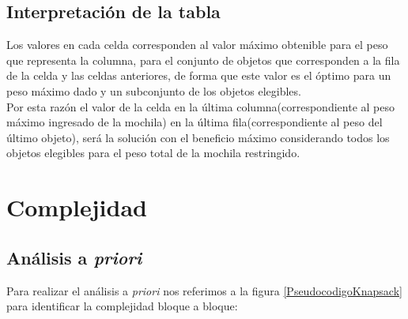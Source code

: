 \newpage 

\subsection*{Interpretación de la tabla}
    Los valores en cada celda corresponden al valor máximo obtenible para el peso que representa la columna, para el conjunto de objetos que corresponden a la fila de la celda y las celdas anteriores, de forma que este valor es el óptimo para un peso máximo dado y un subconjunto de los objetos elegibles.\\
    
    Por esta razón el valor de la celda en la última columna(correspondiente al peso máximo ingresado de la mochila) en la última fila(correspondiente al peso del último objeto), será la solución con el beneficio máximo considerando todos los objetos elegibles para el peso total de la mochila restringido.\\

\section*{Complejidad}
    \subsection*{Análisis a \textit{priori}}    
        Para realizar el análisis a \textit{priori} nos referimos a la figura \ref{PseudocodigoKnapsack} para identificar la complejidad bloque a bloque:
        
